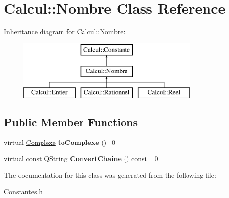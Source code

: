 \hypertarget{class_calcul_1_1_nombre}{\section{Calcul\-:\-:Nombre Class Reference}
\label{class_calcul_1_1_nombre}
}
Inheritance diagram for Calcul\-:\-:Nombre\-:\begin{figure}[H]
\begin{center}
\leavevmode
\includegraphics[height=3.000000cm]{class_calcul_1_1_nombre}
\end{center}
\end{figure}
\subsection*{Public Member Functions}
\begin{DoxyCompactItemize}
\item 
\hypertarget{class_calcul_1_1_nombre_a01b0c03ea3d7493e6d853768cce6f096}{virtual \hyperlink{class_calcul_1_1_complexe}{Complexe} {\bfseries to\-Complexe} ()=0}\label{class_calcul_1_1_nombre_a01b0c03ea3d7493e6d853768cce6f096}

\item 
\hypertarget{class_calcul_1_1_nombre_aa2a937e5d718f73f0edf25b702c11551}{virtual const Q\-String {\bfseries Convert\-Chaine} () const =0}\label{class_calcul_1_1_nombre_aa2a937e5d718f73f0edf25b702c11551}

\end{DoxyCompactItemize}


The documentation for this class was generated from the following file\-:\begin{DoxyCompactItemize}
\item 
Constantes.\-h\end{DoxyCompactItemize}
